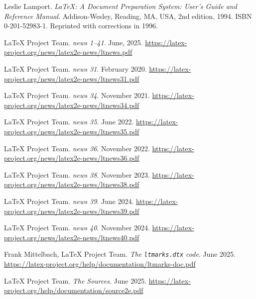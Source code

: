 \documentclass{ltnews}
\begin{document}

\begin{thebibliography}{9}\frenchspacing


Leslie Lamport.
\newblock \emph{{\LaTeX}: {A} Document Preparation System: User's Guide and Reference
  Manual}.
\newblock \mbox{Addison}-Wesley, Reading, MA, USA, 2nd edition, 1994.
\newblock ISBN 0-201-52983-1.
\newblock Reprinted with corrections in 1996.

 \LaTeX{} Project Team.
  \emph{\LaTeXe{} news 1--41}. June, 2025.
  \url{https://latex-project.org/news/latex2e-news/ltnews.pdf}

 \LaTeX{} Project Team.
  \emph{\LaTeXe{} news 31}. February 2020.
  \url{https://latex-project.org/news/latex2e-news/ltnews31.pdf}

 \LaTeX{} Project Team.
  \emph{\LaTeXe{} news 34}. November 2021.
  \url{https://latex-project.org/news/latex2e-news/ltnews34.pdf}

 \LaTeX{} Project Team.
  \emph{\LaTeXe{} news 35}. June 2022.
  \url{https://latex-project.org/news/latex2e-news/ltnews35.pdf}

 \LaTeX{} Project Team.
  \emph{\LaTeXe{} news 36}. November 2022.
  \url{https://latex-project.org/news/latex2e-news/ltnews36.pdf}

 \LaTeX{} Project Team.
  \emph{\LaTeXe{} news 38}. November 2023.
  \url{https://latex-project.org/news/latex2e-news/ltnews38.pdf}

 \LaTeX{} Project Team.
  \emph{\LaTeXe{} news 39}. June 2024.
  \url{https://latex-project.org/news/latex2e-news/ltnews39.pdf}

 \LaTeX{} Project Team.
  \emph{\LaTeXe{} news 40}. November 2024.
  \url{https://latex-project.org/news/latex2e-news/ltnews40.pdf}

 Frank Mittelbach, \LaTeX{} Project Team.
  \emph{The \texttt{ltmarks.dtx} code}. June 2025.
  \url{https://latex-project.org/help/documentation/ltmarks-doc.pdf}

 \LaTeX{} Project Team.
  \emph{The \LaTeXe{} Sources}. June 2025.
  \url{https://latex-project.org/help/documentation/source2e.pdf}

\end{thebibliography}
\end{document}

